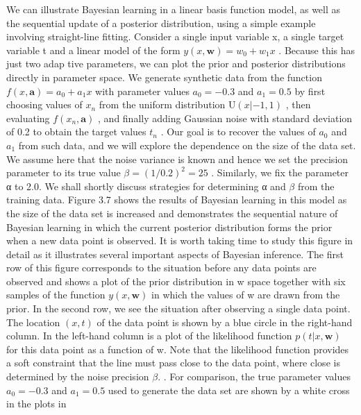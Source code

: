 \documentclass[
  10
]{article}
\begin{document}
We can illustrate Bayesian learning in a linear basis function model, as
well as the sequential update of a posterior distribution, using a
simple example involving straight-line fitting. Consider a single input
variable x, a single target variable t and a linear model of the form
\(y ( x , \mathbf { w } ) = w _ { 0 } + w _ { 1 } x\) . Because this has
just two adap tive parameters, we can plot the prior and posterior
distributions directly in parameter space. We generate synthetic data
from the function \(f ( x , \mathbf { a } ) = a _ { 0 } + a _ { 1 } x\)
with parameter values \(a _ { 0 } = - 0 . 3\) and \(a _ { 1 } = 0 . 5\)
by first choosing values of \(x _ { n }\) from the uniform distribution
\(\mathrm { U } ( x | - 1 , 1 )\) , then evaluating
\(f ( x _ { n } , \mathbf { a } )\) , and finally adding Gaussian noise
with standard deviation of 0.2 to obtain the target values \(t _ { n }\)
. Our goal is to recover the values of \(a _ { 0 }\) and \(a _ { 1 }\)
from such data, and we will explore the dependence on the size of the
data set. We assume here that the noise variance is known and hence we
set the precision parameter to its true value
\(\beta = ( 1 / 0 . 2 ) ^ { 2 } = 2 5\) . Similarly, we fix the
parameter α to 2.0. We shall shortly discuss strategies for determining
α and \(\beta\) from the training data. Figure 3.7 shows the results of
Bayesian learning in this model as the size of the data set is increased
and demonstrates the sequential nature of Bayesian learning in which the
current posterior distribution forms the prior when a new data point is
observed. It is worth taking time to study this figure in detail as it
illustrates several important aspects of Bayesian inference. The first
row of this figure corresponds to the situation before any data points
are observed and shows a plot of the prior distribution in w space
together with six samples of the function \(y ( x , \mathbf { w } )\) in
which the values of w are drawn from the prior. In the second row, we
see the situation after observing a single data point. The location
\(( x , t )\) of the data point is shown by a blue circle in the
right-hand column. In the left-hand column is a plot of the likelihood
function \(p ( t | x , \mathbf { w } )\) for this data point as a
function of w. Note that the likelihood function provides a soft
constraint that the line must pass close to the data point, where close
is determined by the noise precision \(\beta .\) . For comparison, the
true parameter values \(a _ { 0 } = - 0 . 3\) and \(a _ { 1 } = 0 . 5\)
used to generate the data set are shown by a white cross in the plots in
\end{document}
